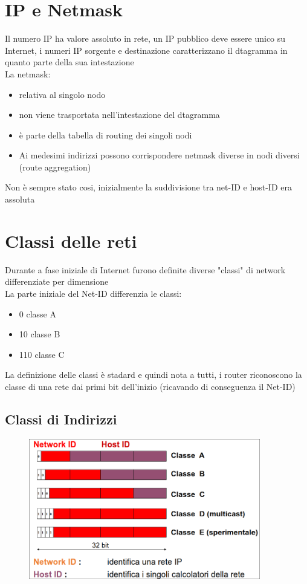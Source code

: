 \documentclass{report}
\begin{document}
        \section{IP e Netmask}
            Il numero IP ha valore assoluto in rete, un IP pubblico deve essere unico su Internet, i numeri IP sorgente e destinazione caratterizzano il dtagramma in quanto parte della sua intestazione
            \\
            La netmask:
            \begin{itemize}
                \item relativa al singolo nodo
                \item  non viene trasportata nell'intestazione del dtagramma
                \item è parte della tabella di routing dei singoli nodi
                \item Ai medesimi indirizzi possono corrispondere netmask diverse in nodi diversi (route aggregation)
            \end{itemize}
            Non è sempre stato cosi, inizialmente la suddivisione tra net-ID e host-ID era assoluta
        \section{Classi delle reti}
            Durante a fase iniziale di Internet furono definite diverse "classi" di network differenziate per dimensione
            \\
            La parte iniziale del Net-ID differenzia le classi:
            \begin{itemize}
                \item 0 classe A
                \item 10 classe B
                \item 110 classe C
            \end{itemize}
            La definizione delle classi è stadard e quindi nota a tutti, i router riconoscono la classe di una rete dai primi bit dell'inizio (ricavando di conseguenza il Net-ID)
            \subsection{Classi di Indirizzi}
                \begin{figure}[H]
                    \includegraphics[width=0.9\textwidth]{1/cI.png}
                \end{figure}
\end{document}
